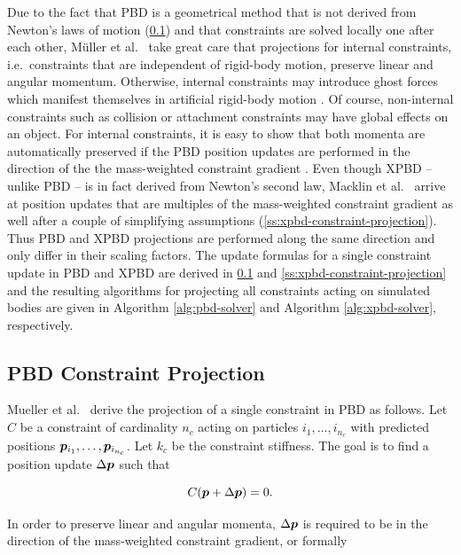 Due to the fact that PBD is a geometrical method that is not derived from Newton's laws of motion (\cref{ss:pbd-constraint-projection}) and that 
constraints are solved locally one after each 
other, Müller et al.\ \cite{mueller2006} take great care that projections for internal constraints, i.e.\ constraints that are independent of rigid-body 
motion, preserve linear and angular momentum. Otherwise, internal constraints may introduce ghost forces which manifest themselves in artificial 
rigid-body motion \cite{mueller2006}. Of course, non-internal constraints such as collision or 
attachment constraints may have global effects on an object. For internal constraints, it is easy to show that both momenta are automatically preserved 
if the PBD position updates are performed in the direction of the the mass-weighted constraint gradient \cite{mueller2006}. Even though XPBD -- unlike 
PBD -- is in fact derived from Newton's second law, Macklin et al.\ \cite{macklin2016} arrive at position updates that are multiples of the mass-weighted 
constraint gradient as well after a couple of simplifying assumptions (\cref{ss:xpbd-constraint-projection}). Thus PBD and XPBD projections 
are performed along the same direction and only differ in their scaling factors. The update formulas for a single constraint update in PBD and XPBD are 
derived in \cref{ss:pbd-constraint-projection} and \cref{ss:xpbd-constraint-projection} and the resulting algorithms for projecting all constraints 
acting on simulated bodies are given in Algorithm \ref{alg:pbd-solver} and Algorithm \ref{alg:xpbd-solver}, respectively.

\subsection{PBD Constraint Projection}\label{ss:pbd-constraint-projection}

Mueller et al.\ \cite{mueller2006} derive the projection of a single constraint in PBD as follows. Let $C$ be a constraint of cardinality $n_c$ 
acting on particles $i_1, \ldots, i_{n_c}$ with predicted positions $\bm{p}_{i_1}, \ldots, \bm{p}_{i_{n_c}}$. Let $k_c$ be the constraint 
stiffness. The goal is to find a position update $\Delta \bm{p}$ such that 

\begin{equation}\label{eq:pbd-delta}
    C(\bm{p} + \Delta \bm{p}) = 0.
\end{equation}

\noindent In order to preserve linear and angular momenta, $\Delta \bm{p}$ is required to be in the direction of the mass-weighted constraint 
gradient, or formally

